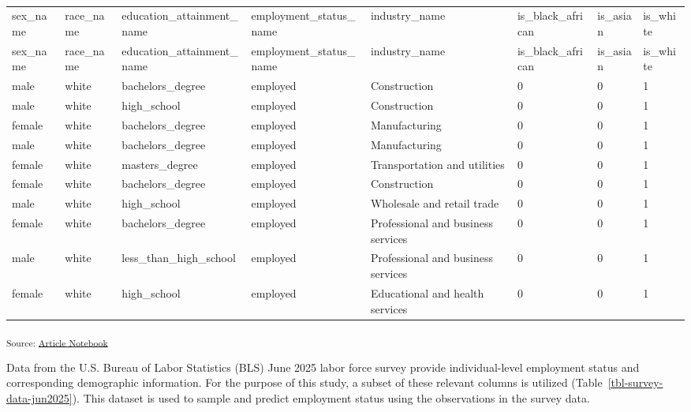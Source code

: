 \documentclass[
]{agujournal2019}
\begin{document}
\begin{longtable}[]{@{}llllllll@{}}

\caption{\label{tbl-survey-data-jun2025}BLS June 2025 Labor Force Survey
Data}

\tabularnewline

\caption{}\label{T_34704}\tabularnewline
\toprule\noalign{}
sex\_name & race\_name & education\_attainment\_name &
employment\_status\_name & industry\_name & is\_black\_african &
is\_asian & is\_white \\
\midrule\noalign{}
\endfirsthead
\toprule\noalign{}
sex\_name & race\_name & education\_attainment\_name &
employment\_status\_name & industry\_name & is\_black\_african &
is\_asian & is\_white \\
\midrule\noalign{}
\endhead
\bottomrule\noalign{}
\endlastfoot
male & white & bachelors\_degree & employed & Construction & 0 & 0 &
1 \\
male & white & high\_school & employed & Construction & 0 & 0 & 1 \\
female & white & bachelors\_degree & employed & Manufacturing & 0 & 0 &
1 \\
male & white & bachelors\_degree & employed & Manufacturing & 0 & 0 &
1 \\
female & white & masters\_degree & employed & Transportation and
utilities & 0 & 0 & 1 \\
female & white & bachelors\_degree & employed & Construction & 0 & 0 &
1 \\
male & white & high\_school & employed & Wholesale and retail trade & 0
& 0 & 1 \\
female & white & bachelors\_degree & employed & Professional and
business services & 0 & 0 & 1 \\
male & white & less\_than\_high\_school & employed & Professional and
business services & 0 & 0 & 1 \\
female & white & high\_school & employed & Educational and health
services & 0 & 0 & 1 \\

\end{longtable}

\textsubscript{Source:
\href{https://mw1296.github.io/dsan5650_social_causal_inference/index.qmd.html}{Article
Notebook}}

Data from the U.S. Bureau of Labor Statistics (BLS) June 2025 labor
force survey provide individual-level employment status and
corresponding demographic information. For the purpose of this study, a
subset of these relevant columns is utilized
(Table~\ref{tbl-survey-data-jun2025}). This dataset is used to sample
and predict employment status using the observations in the survey data.
\end{document}
